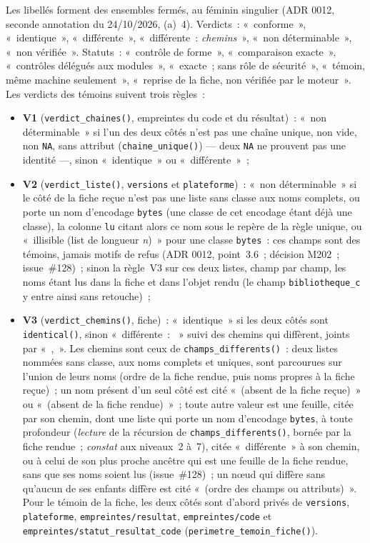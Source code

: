 \documentclass[a4paper,11pt]{article}
\newcommand{\code}[1]{\texttt{\small #1}}
\begin{document}
\noindent
Les libellés forment des ensembles fermés, au féminin singulier (ADR 0012,
seconde annotation du 24/10/2026, (a)~4). Verdicts~: «~conforme~»,
«~identique~», «~différente~», «~différente~: \emph{chemins}~», «~non
déterminable~», «~non vérifiée~». Statuts~: «~contrôle de forme~»,
«~comparaison exacte~», «~contrôles délégués aux modules~», «~exacte~; sans
rôle de sécurité~», «~témoin, même machine seulement~», «~reprise de la
fiche, non vérifiée par le moteur~». Les verdicts des témoins suivent trois
règles~:
\begin{itemize}[leftmargin=*, itemsep=2pt]
  \item \textbf{V1} (\code{verdict\_chaines()}, empreintes du code et du
    résultat)~: «~non déterminable~» si l'un des deux côtés n'est pas une
    chaîne unique, non vide, non \code{NA}, sans attribut
    (\code{chaine\_unique()}) --- deux \code{NA} ne prouvent pas une
    identité ---, sinon «~identique~» ou «~différente~»~;
  \item \textbf{V2} (\code{verdict\_liste()}, \code{versions} et
    \code{plateforme})~: «~non déterminable~» si le côté de la fiche reçue
    n'est pas une liste sans classe aux noms complets, ou porte un nom
    d'encodage \code{bytes} (une classe de cet encodage étant déjà une
    classe), la colonne \code{lu} citant alors ce nom sous le repère de la
    règle unique, ou «~illisible (list de longueur \emph{n})~» pour une
    classe \code{bytes}~: ces champs sont des témoins, jamais motifs de
    refus (ADR 0012, point~3.6~; décision M202~; issue~\#128)~; sinon la règle~V3 sur
    ces deux listes, champ par champ, les noms étant lus dans la fiche et
    dans l'objet rendu (le champ \code{bibliotheque\_c} y entre ainsi sans
    retouche)~;
  \item \textbf{V3} (\code{verdict\_chemins()}, fiche)~: «~identique~» si
    les deux côtés sont \code{identical()}, sinon «~différente~: ~» suivi
    des chemins qui diffèrent, joints par «~,~». Les chemins sont ceux de
    \code{champs\_differents()}~: deux listes nommées sans classe, aux noms
    complets et uniques, sont parcourues sur l'union de leurs noms (ordre de
    la fiche rendue, puis noms propres à la fiche reçue)~; un nom présent
    d'un seul côté est cité «~(absent de la fiche reçue)~» ou «~(absent de la
    fiche rendue)~»~; toute autre valeur est une feuille, citée par son
    chemin, dont une liste qui porte un nom d'encodage \code{bytes}, à
    toute profondeur (\emph{lecture} de la récursion de
    \code{champs\_differents()}, bornée par la fiche rendue~;
    \emph{constat} aux niveaux~2 à~7), citée «~différente~» à son chemin,
    ou à celui de son plus proche ancêtre qui est une feuille de la fiche
    rendue, sans que ses noms soient lus (issue~\#128)~; un nœud qui diffère sans qu'aucun de ses enfants diffère est
    cité «~(ordre des champs ou attributs)~». Pour le témoin de la fiche,
    les deux côtés sont d'abord privés de \code{versions},
    \code{plateforme}, \code{empreintes/resultat}, \code{empreintes/code} et
    \code{empreintes/statut\_resultat\_code}
    (\code{perimetre\_temoin\_fiche()}).
\end{itemize}
\end{document}
